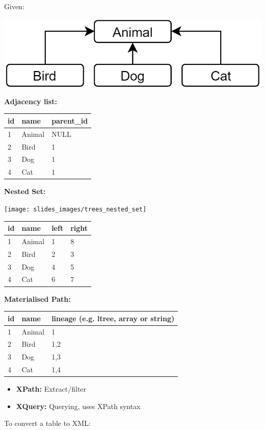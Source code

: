 \begin{breakbox}

Given:
\begin{center}
	\includegraphics[width=.10\textwidth]{slides_images/tree_given_example}
\end{center}

\textbf{Adjacency list:}

\begin{tabular}{lll}
id & name   & parent\_id \\
\hline
1  & Animal & NULL       \\
2  & Bird   & 1          \\
3  & Dog    & 1          \\
4  & Cat    & 1         
\end{tabular}

\textbf{Nested Set:}
\begin{center}
	\texttt{[image: slides\_images/trees\_nested\_set]}
\end{center}

\begin{tabular}{llll}
id & name   & left & right \\
\hline
1  & Animal & 1    & 8     \\
2  & Bird   & 2    & 3     \\
3  & Dog    & 4    & 5     \\
4  & Cat    & 6    & 7    
\end{tabular}

\textbf{Materialised Path:}

\begin{tabular}{lll}
id & name   & lineage (e.g. ltree, array or string) \\
\hline
1  & Animal & 1                    \\
2  & Bird   & 1,2                  \\
3  & Dog    & 1,3                  \\
4  & Cat    & 1,4                 
\end{tabular}
\end{breakbox}

\begin{breakbox}

\begin{itemize}
	\item \textbf{XPath:} Extract/filter
	\item \textbf{XQuery:} Querying, uses XPath syntax
\end{itemize}

To convert a table to XML:

\end{breakbox}

